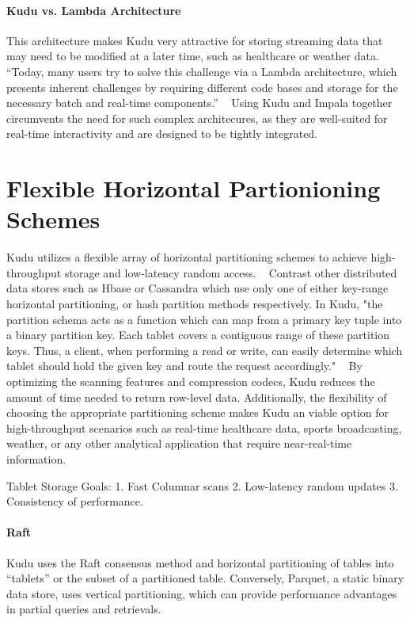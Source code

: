 \paragraph{Kudu vs. Lambda Architecture}
This architecture makes Kudu very attractive for storing streaming
data that may need to be modified at a later time, such as healthcare
or weather data. ~\cite{hid-sp18-407-kudu-schema-design}
``Today, many users try to solve this challenge via a Lambda architecture, which presents inherent challenges by requiring different code bases and storage for the
necessary batch and real-time components.'' ~\cite{hid-sp18-407-kudu-impala-integration}
Using Kudu and Impala together circumvents the need for such complex architecures, as they
are well-suited for real-time interactivity and are designed to be tightly integrated.  

\section{Flexible Horizontal Partionioning Schemes}
Kudu utilizes a flexible array of horizontal partitioning schemes to
achieve high-throughput storage and low-latency random access. ~\cite{hid-sp18-407-kudu-intro}
Contrast other distributed data stores such as Hbase or Cassandra
which use only one of either key-range horizontal partitioning, or hash partition
methods respectively. In Kudu, "the partition schema acts as a
function which can map from a primary key tuple into a binary
partition key.  Each tablet covers a contiguous  range  of  these
partition keys. Thus,  a client, when performing a read or write, can
easily determine which tablet should hold the given key and route the
request accordingly." ~\cite{hid-sp18-407-kudu-intro}
By optimizing the scanning features and compression codecs, Kudu reduces the amount of time needed to return row-level data. Additionally, the flexibility of choosing the
appropriate partitioning scheme makes Kudu an viable option for
high-throughput scenarios such as real-time healthcare data, sports broadcasting,
weather, or any other analytical application that require near-real-time information.

\begin{enumerate}
Tablet Storage Goals: 
1. Fast Columnar scans
2. Low-latency random updates
3. Consistency of performance.
\end{enumerate}

\paragraph{Raft}
Kudu uses the Raft consensus method and horizontal partitioning of
tables into ``tablets'' or the subset of a partitioned table.
Conversely, Parquet, a static binary data store, uses vertical
partitioning, which can provide performance advantages in partial
queries and retrievals. ~\cite{hid-sp18-407-benchmarking-kudu}

